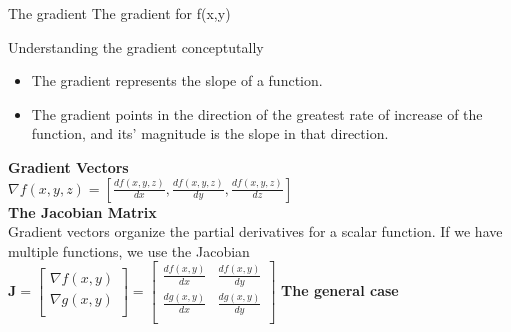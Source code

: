 \documentclass{article}
\begin{document}
The gradient
The gradient for f(x,y)

Understanding the gradient conceptutally  \\
\begin{itemize}
    \item The gradient represents the slope of a function.
    \item  The gradient points in the direction of the greatest rate of increase of the function,
    and its' magnitude is the slope in that direction.
\end{itemize}
\textbf{Gradient Vectors}\\
\begin{math}
    \nabla f(x,y,z) = [\frac{df(x,y,z)}{dx},\frac{df(x,y,z)}{dy},\frac{df(x,y,z)}{dz}]
\end{math} \\
\textbf{The Jacobian Matrix}\\
Gradient vectors organize the partial derivatives for a scalar function. If we have multiple functions, we use the Jacobian\\
\begin{math}
    \textbf{J}= 
    \begin{bmatrix}
        \nabla f(x,y)\\
        \nabla g(x,y)\\
    \end{bmatrix}
    = \begin{bmatrix}
        \frac{df(x,y)}{dx} & \frac{df(x,y)}{dy} \\
        \frac{dg(x,y)}{dx} & \frac{dg(x,y)}{dy} \\
    \end{bmatrix}
\end{math}\newline
\textbf{The general case}\\
\end{document}
